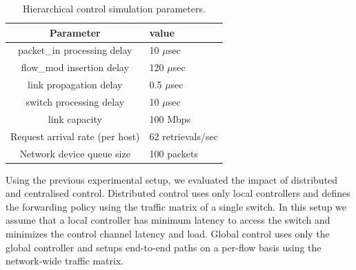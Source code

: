 \begin{table}
\begin{center}
\begin{tabular}{|c| l |} \hline
  Parameter & value \\ \hline
  packet\_in processing delay & 10 $\mu$sec \\ \hline
  flow\_mod insertion delay & 120 $\mu$sec \\ \hline
  link propagation delay & 0.5 $\mu$sec \\ \hline
  switch processing delay & 10 $\mu$sec \\ \hline
  link capacity & 100 Mbps \\ \hline
  Request arrival rate (per host) & 62 retrievals/sec \\ \hline
  Network device queue size & 100 packets \\ \hline
\end{tabular}
\end{center}
\label{tbl:sdnsim_experiment_parameters}
\caption{Hierarchical control simulation parameters.}
\end{table}

Using the previous experimental setup, we evaluated the impact of distributed
and centralised control. Distributed control uses only local controllers and
defines the forwarding policy using the traffic matrix of a single switch. In
this setup we assume that a local controller has minimum latency to access
the switch and minimizes the control channel latency and load. Global control
uses only the global controller and setups end-to-end paths on a per-flow basis
using the network-wide traffic matrix.

